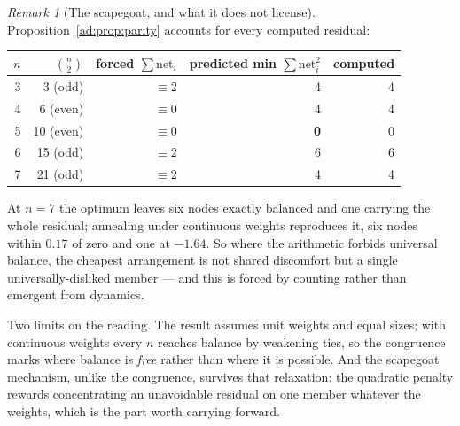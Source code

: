 \documentclass[11pt]{article}
\numberwithin{equation}{section}
\theoremstyle{plain}
\theoremstyle{definition}
\theoremstyle{remark}
\newtheorem{remark}[theorem]{Remark}
\begin{document}
\begin{remark}[The scapegoat, and what it does not license]
\label{ad:rem:scapegoat}
Proposition~\ref{ad:prop:parity} accounts for every computed residual:
\begin{center}\small
\begin{tabular}{@{}rrrrr@{}}
\toprule
$n$ & $\binom n2$ & forced $\sum\mathrm{net}_i$ & predicted min
$\sum\mathrm{net}_i^2$ & computed\\
\midrule
3 & 3 (odd) & $\equiv2$ & 4 & 4\\
4 & 6 (even) & $\equiv0$ & 4 & 4\\
5 & 10 (even) & $\equiv0$ & \textbf{0} & 0\\
6 & 15 (odd) & $\equiv2$ & 6 & 6\\
7 & 21 (odd) & $\equiv2$ & 4 & 4\\
\bottomrule
\end{tabular}
\end{center}
At $n=7$ the optimum leaves six nodes exactly balanced and one carrying
the whole residual; annealing under continuous weights reproduces it,
six nodes within $0.17$ of zero and one at $-1.64$. So where the
arithmetic forbids universal balance, the cheapest arrangement is not
shared discomfort but a single universally-disliked member --- and this
is forced by counting rather than emergent from dynamics.

Two limits on the reading. The result assumes unit weights and equal
sizes; with continuous weights every $n$ reaches balance by weakening
ties, so the congruence marks where balance is \emph{free} rather than
where it is possible. And the scapegoat mechanism, unlike the
congruence, survives that relaxation: the quadratic penalty rewards
concentrating an unavoidable residual on one member whatever the
weights, which is the part worth carrying forward.
\end{remark}
\end{document}
